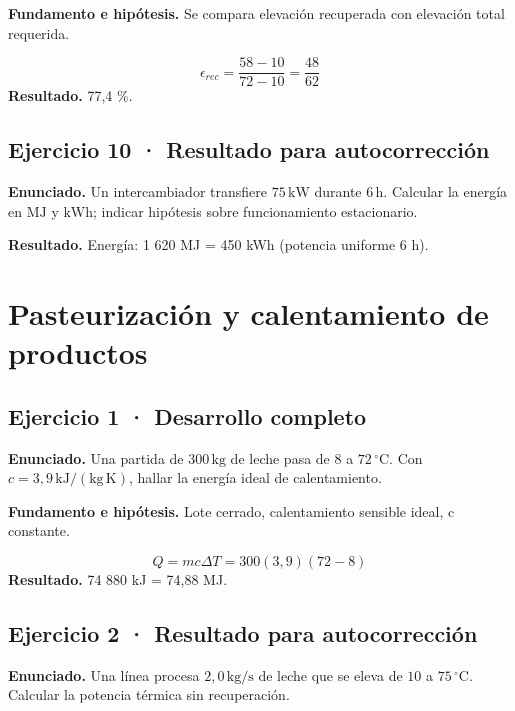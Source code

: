 \documentclass[11pt,a4paper]{article}
\begin{document}
\textbf{Fundamento e hipótesis.} Se compara elevación recuperada con elevación total requerida.

\[
\epsilon_{rec}=\frac{58-10}{72-10}=\frac{48}{62}
\]
\textbf{Resultado.} 77,4 \%.


\subsection*{Ejercicio 10 · Resultado para autocorrección}
\textbf{Enunciado.} Un intercambiador transfiere \(75\,\mathrm{kW}\) durante \(6\,\mathrm h\). Calcular la energía en \(\mathrm{MJ}\) y \(\mathrm{kWh}\); indicar hipótesis sobre funcionamiento estacionario.

\textbf{Resultado.} Energía: 1 620 MJ = 450 kWh (potencia uniforme 6 h).


\clearpage

\section{Pasteurización y calentamiento de productos}

\begin{center}\end{center}

\subsection*{Ejercicio 1 · Desarrollo completo}
\textbf{Enunciado.} Una partida de \(300\,\mathrm{kg}\) de leche pasa de \(8\) a \(72\,^\circ\mathrm C\). Con \(c=3{,}9\,\mathrm{kJ/(kg\,K)}\), hallar la energía ideal de calentamiento.

\textbf{Fundamento e hipótesis.} Lote cerrado, calentamiento sensible ideal, c constante.

\[
Q=mc\Delta T=300(3{,}9)(72-8)
\]
\textbf{Resultado.} 74 880 kJ = 74,88 MJ.


\subsection*{Ejercicio 2 · Resultado para autocorrección}
\textbf{Enunciado.} Una línea procesa \(2{,}0\,\mathrm{kg/s}\) de leche que se eleva de \(10\) a \(75\,^\circ\mathrm C\). Calcular la potencia térmica sin recuperación.
\end{document}
